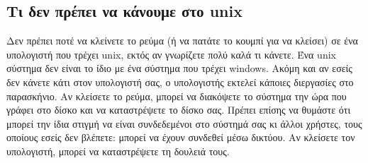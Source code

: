 \subsection{Τι δεν πρέπει να κάνουμε στο unix}

Δεν πρέπει ποτέ να κλείνετε το ρεύμα (ή να πατάτε το κουμπί για να κλείσει) σε ένα υπολογιστή που τρέχει unix, εκτός αν γνωρίζετε πολύ καλά τι κάνετε. Ένα unix σύστημα δεν είναι το ίδιο με ένα σύστημα που τρέχει windows. Ακόμη και αν εσείς δεν κάνετε κάτι στον υπολογιστή σας, ο υπολογιστής εκτελεί κάποιες διεργασίες στο παρασκήνιο. Αν κλείσετε το ρεύμα, μπορεί να διακόψετε το σύστημα την ώρα που γράφει στο δίσκο και να καταστρέψετε το δίσκο σας. Πρέπει επίσης να θυμάστε ότι μπορεί την ίδια στιγμή να είναι συνδεδεμένοι στο σύστημά σας κι άλλοι χρήστες, τους οποίους εσείς δεν βλέπετε: μπορεί να έχουν συνδεθεί μέσω δικτύου. Αν κλείσετε τον υπολογιστή, μπορεί να καταστρέψετε τη δουλειά τους. 

